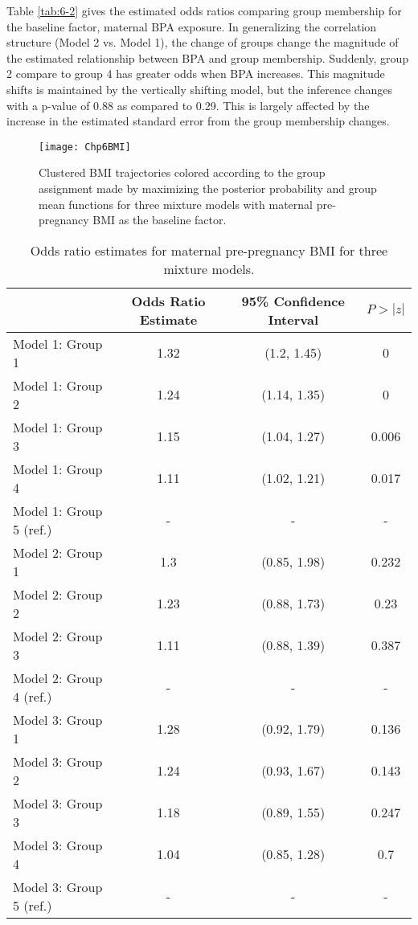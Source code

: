 Table \ref{tab:6-2} gives the estimated odds ratios comparing group membership for the baseline factor, maternal BPA exposure. In generalizing the correlation structure (Model 2 vs. Model 1), the change of groups change the magnitude of the estimated relationship between BPA and group membership. Suddenly, group 2 compare to group 4 has greater odds when BPA increases. This magnitude shifts is maintained by the vertically shifting model, but the inference changes with a p-value of 0.88 as compared to 0.29. This is largely affected by the increase in the estimated standard error from the group membership changes.

\begin{figure}[h]
\begin{center}
\texttt{[image: Chp6BMI]}
\end{center}
\label{fig:6-1}
\caption{Clustered BMI trajectories colored according to the group assignment made by maximizing the posterior probability and group mean functions for three mixture models with maternal pre-pregnancy BMI as the baseline factor.}
\end{figure}

\begin{table}[ht]
\begin{center}
\begin{tabular}{lccc}
  \hline
 & Odds Ratio Estimate & 95\% Confidence Interval & $P>|z|$ \\ 
  \hline
Model 1: Group  1 & 1.32 & (1.2, 1.45) & 0 \\ 
  Model 1: Group  2 & 1.24 & (1.14, 1.35) & 0 \\ 
  Model 1: Group  3 & 1.15 & (1.04, 1.27) & 0.006 \\ 
  Model 1: Group  4 & 1.11 & (1.02, 1.21) & 0.017 \\ 
  Model 1: Group  5  (ref.) & - & - & - \\ 
  Model 2: Group  1 & 1.3 & (0.85, 1.98) & 0.232 \\ 
  Model 2: Group  2 & 1.23 & (0.88, 1.73) & 0.23 \\ 
  Model 2: Group  3 & 1.11 & (0.88, 1.39) & 0.387 \\ 
  Model 2: Group  4  (ref.) & - & - & - \\ 
  Model 3: Group  1 & 1.28 & (0.92, 1.79) & 0.136 \\ 
  Model 3: Group  2 & 1.24 & (0.93, 1.67) & 0.143 \\ 
  Model 3: Group  3 & 1.18 & (0.89, 1.55) & 0.247 \\ 
  Model 3: Group  4 & 1.04 & (0.85, 1.28) & 0.7 \\ 
  Model 3: Group  5  (ref.) & - & - & - \\ 
   \hline
\end{tabular}
\caption{Odds ratio estimates for maternal pre-pregnancy BMI for three mixture models. }
\end{center}
\label{tab:6-1}
\end{table}

